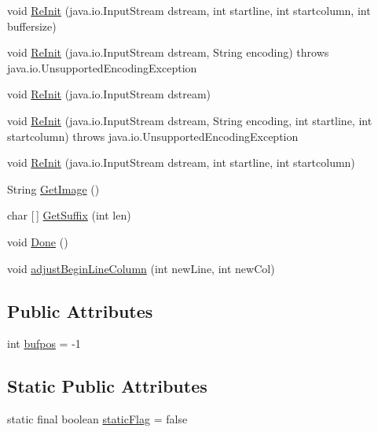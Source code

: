 \begin{DoxyCompactItemize}
\item 
void \mbox{\hyperlink{classanalizadores_1_1_simple_char_stream_a539ab799edc2ed4fb47f9610d6328393}{Re\+Init}} (java.\+io.\+Input\+Stream dstream, int startline, int startcolumn, int buffersize)
\item 
void \mbox{\hyperlink{classanalizadores_1_1_simple_char_stream_a947f68635529dd654e982b65b250432a}{Re\+Init}} (java.\+io.\+Input\+Stream dstream, String encoding)  throws java.\+io.\+Unsupported\+Encoding\+Exception   
\item 
void \mbox{\hyperlink{classanalizadores_1_1_simple_char_stream_a3fc08691c124d2c6c9dd1f5edfbc1fd3}{Re\+Init}} (java.\+io.\+Input\+Stream dstream)
\item 
void \mbox{\hyperlink{classanalizadores_1_1_simple_char_stream_acd17c0194c5b3d2b3506782e57793e78}{Re\+Init}} (java.\+io.\+Input\+Stream dstream, String encoding, int startline, int startcolumn)  throws java.\+io.\+Unsupported\+Encoding\+Exception   
\item 
void \mbox{\hyperlink{classanalizadores_1_1_simple_char_stream_ae94f07895d46eb432af5b6f43a20630b}{Re\+Init}} (java.\+io.\+Input\+Stream dstream, int startline, int startcolumn)
\item 
String \mbox{\hyperlink{classanalizadores_1_1_simple_char_stream_aeb5b88a70873ad9cc35763622397b6f2}{Get\+Image}} ()
\item 
char \mbox{[}$\,$\mbox{]} \mbox{\hyperlink{classanalizadores_1_1_simple_char_stream_a3312f3c97f5b1b00635960754d1fc777}{Get\+Suffix}} (int len)
\item 
void \mbox{\hyperlink{classanalizadores_1_1_simple_char_stream_a4760af11a45ce9451c5bc1b43d1e48fc}{Done}} ()
\item 
void \mbox{\hyperlink{classanalizadores_1_1_simple_char_stream_a108c5d7d6556c924a0cacd480e9860e1}{adjust\+Begin\+Line\+Column}} (int new\+Line, int new\+Col)
\end{DoxyCompactItemize}
\subsection*{Public Attributes}
\begin{DoxyCompactItemize}
\item 
int \mbox{\hyperlink{classanalizadores_1_1_simple_char_stream_ae6a80a1bd35bee86088babe7ff27b68a}{bufpos}} = -\/1
\end{DoxyCompactItemize}
\subsection*{Static Public Attributes}
\begin{DoxyCompactItemize}
\item 
static final boolean \mbox{\hyperlink{classanalizadores_1_1_simple_char_stream_a3099cb81a656d590a7a974110326af9e}{static\+Flag}} = false
\end{DoxyCompactItemize}
